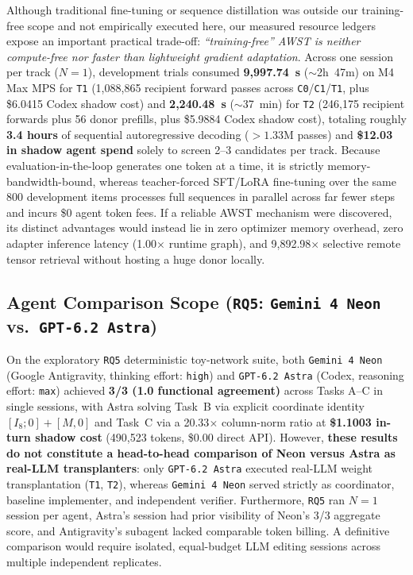 \documentclass[11pt]{article}
\begin{document}
Although traditional fine-tuning or sequence distillation was outside our training-free scope and not empirically executed here, our measured resource ledgers expose an important practical trade-off: \emph{``training-free'' AWST is neither compute-free nor faster than lightweight gradient adaptation}. Across one session per track ($N=1$), development trials consumed \textbf{9,997.74~s} ($\sim$2h~47m) on M4 Max MPS for \texttt{T1} (1,088,865 recipient forward passes across \texttt{C0}/\texttt{C1}/\texttt{T1}, plus \$6.0415 Codex shadow cost) and \textbf{2,240.48~s} ($\sim$37~min) for \texttt{T2} (246,175 recipient forwards plus 56 donor prefills, plus \$5.9884 Codex shadow cost), totaling roughly \textbf{3.4 hours} of sequential autoregressive decoding ($> 1.33$M passes) and \textbf{\$12.03 in shadow agent spend} solely to screen 2--3 candidates per track. Because evaluation-in-the-loop generates one token at a time, it is strictly memory-bandwidth-bound, whereas teacher-forced SFT/LoRA fine-tuning over the same 800 development items processes full sequences in parallel across far fewer steps and incurs \$0 agent token fees. If a reliable AWST mechanism were discovered, its distinct advantages would instead lie in zero optimizer memory overhead, zero adapter inference latency (1.00$\times$ runtime graph), and 9,892.98$\times$ selective remote tensor retrieval without hosting a huge donor locally.

\subsection{Agent Comparison Scope (\texttt{RQ5}: \texttt{Gemini 4 Neon} vs.\ \texttt{GPT-6.2 Astra})}

On the exploratory \texttt{RQ5} deterministic toy-network suite, both \texttt{Gemini 4 Neon} (Google Antigravity, thinking effort: \texttt{high}) and \texttt{GPT-6.2 Astra} (Codex, reasoning effort: \texttt{max}) achieved \textbf{3/3 (1.0 functional agreement)} across Tasks A--C in single sessions, with Astra solving Task~B via explicit coordinate identity $[I_8; 0] + [M, 0]$ and Task~C via a 20.33$\times$ column-norm ratio at \textbf{\$1.1003 in-turn shadow cost} (490,523 tokens, \$0.00 direct API). However, \textbf{these results do not constitute a head-to-head comparison of Neon versus Astra as real-LLM transplanters}: only \texttt{GPT-6.2 Astra} executed real-LLM weight transplantation (\texttt{T1}, \texttt{T2}), whereas \texttt{Gemini 4 Neon} served strictly as coordinator, baseline implementer, and independent verifier. Furthermore, \texttt{RQ5} ran $N=1$ session per agent, Astra's session had prior visibility of Neon's 3/3 aggregate score, and Antigravity's subagent lacked comparable token billing. A definitive comparison would require isolated, equal-budget LLM editing sessions across multiple independent replicates.
\end{document}
